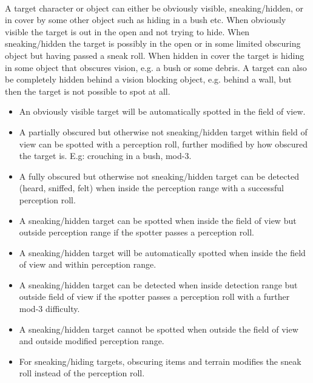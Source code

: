 \

A target character or object can either be obviously visible, sneaking/hidden, or in cover by some other object such as hiding in a bush etc. When obviously visible the target is out in the open and not trying to hide. When sneaking/hidden the target is possibly in the open or in some limited obscuring object but having passed a sneak roll. When hidden in cover the target is hiding in some object that obscures vision, e.g. a bush or some debris. A target can also be completely hidden behind a vision blocking object, e.g. behind a wall, but then the target is not possible to spot at all.

\begin{itemize}

\item An obviously visible target will be automatically spotted in the field of view. 

\item A partially obscured but otherwise not sneaking/hidden target within field of view can be spotted with a perception roll, further modified by how obscured the target is. E.g: crouching in a bush, mod-3.

\item A fully obscured but otherwise not sneaking/hidden target can be detected (heard, sniffed, felt) when inside the perception range with a successful perception roll.

\item A sneaking/hidden target can be spotted when inside the field of view but outside perception range if the spotter passes a perception roll.

\item A sneaking/hidden target will be automatically spotted when inside the field of view and within perception range.

\item A sneaking/hidden target can be detected when inside detection range but outside field of view if the spotter passes a perception roll with a further mod-3 difficulty.

\item A sneaking/hidden target cannot be spotted when outside the field of view and outside modified perception range.

\item For sneaking/hiding targets, obscuring items and terrain modifies the sneak roll instead of the perception roll.

\end{itemize}

